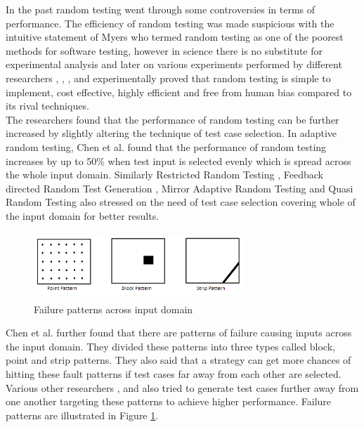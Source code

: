 In the past random testing went through some controversies in terms of performance. The efficiency of random testing was made suspicious with the intuitive statement of Myers \cite{Myers2004} who termed random testing as one of the poorest methods for software testing, however in science there is no substitute for experimental analysis and later on various experiments performed by different researchers \cite{Ciupa2007}, \cite{Duran1981}, \cite{Duran1984}, \cite{Hamlet1994} and \cite{Ntafos2001}  experimentally proved that random testing is simple to implement, cost effective, highly efficient and free from human bias compared to its rival techniques. \\

The researchers found that the performance of random testing can be further increased by slightly altering the technique of test case selection. In adaptive random testing, Chen et al.  \cite{Chen2008} found that the performance of random testing increases by up to 50\% when test input is selected evenly which is spread across the whole input domain. Similarly Restricted Random Testing \cite{Chan2002}, Feedback directed Random Test Generation \cite{Pacheco2007a}, Mirror Adaptive Random Testing \cite{Chen2003} and Quasi Random Testing \cite{Chen2005} also stressed on the need of test case selection covering whole of the input domain for better results. \\


\begin{figure}[htp]
\centering
\includegraphics[width=8cm,height=2.5cm]{figures/ART_Patterns.png}
\caption{Failure patterns across input domain \cite{Chen2006}}
\label{fig:patterns}
\end{figure}

Chen et al. \cite{Chen2008} further found that there are patterns of failure causing inputs across the input domain. They divided these patterns into three types called block, point and strip patterns. They also said that a strategy can get more chances of hitting these fault patterns if test cases far away from each other are selected. Various other researchers \cite{Chan2002}, \cite{Chen2003} and \cite{Chen2005} also tried to generate test cases further away from one another targeting these patterns to achieve higher performance. Failure patterns are illustrated in Figure \ref{fig:patterns}.\\


